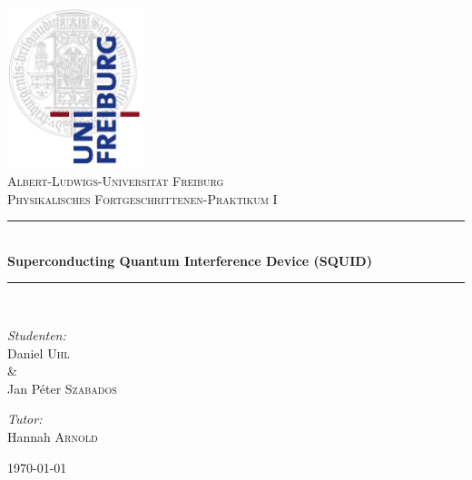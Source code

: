 
\begin{titlepage}

\begin{center}



\includegraphics[width=0.3\textwidth]{Bilder/logo}\\[1.2cm]    

\textsc{\LARGE Albert-Ludwigs-Universit\"at Freiburg}\\[1.75cm]

\textsc{\Large Physikalisches Fortgeschrittenen-Praktikum I}\\[0.75cm]



\newcommand{\HRule}{\rule{\linewidth}{0.5mm}}
\HRule \\[0.5cm]
{ \huge \bfseries Superconducting Quantum Interference Device (SQUID)}\\[0.5cm]

\HRule \\[1.75cm]


\begin{minipage}{0.4\textwidth}
\begin{flushleft} \large
\textit{Studenten:}\\
Daniel \textsc{Uhl}\\ \setlength{\parindent}{1.25cm} \& 
\setlength{\parindent}{0cm} \\ Jan P\'eter \textsc{Szabados} 
\end{flushleft}
\end{minipage}
\hfill
\begin{minipage}{0.4\textwidth}
\begin{flushright} \large
\textit{Tutor:} \\
Hannah \textsc{Arnold}\\
\end{flushright}
\end{minipage}

\vfill


{\large \today}

\end{center}

\end{titlepage}